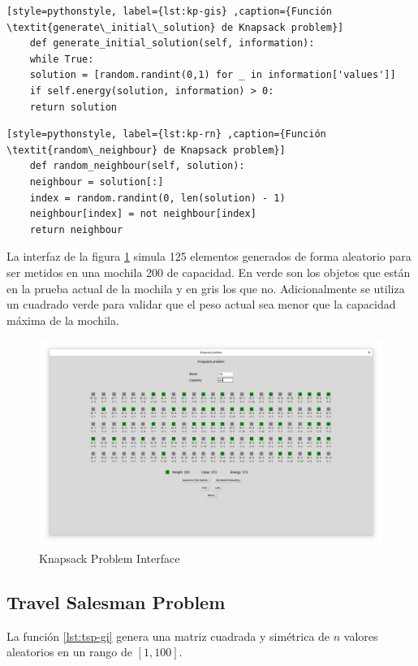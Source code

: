 \begin{lstlisting}[style=pythonstyle, label={lst:kp-gis} ,caption={Función \textit{generate\_initial\_solution} de Knapsack problem}]
	def generate_initial_solution(self, information):
	while True:
	solution = [random.randint(0,1) for _ in information['values']]
	if self.energy(solution, information) > 0:
	return solution
\end{lstlisting}


\begin{lstlisting}[style=pythonstyle, label={lst:kp-rn} ,caption={Función \textit{random\_neighbour} de Knapsack problem}]
	def random_neighbour(self, solution):
	neighbour = solution[:]
	index = random.randint(0, len(solution) - 1)
	neighbour[index] = not neighbour[index]
	return neighbour     
\end{lstlisting}

La interfaz de la figura \ref{fig:kp} simula 125 elementos generados de forma aleatorio para ser metidos en una mochila 200 de capacidad. En verde son los objetos que están en la prueba actual de la mochila y en gris los que no. Adicionalmente se utiliza un cuadrado verde para validar que el peso actual sea menor que la capacidad máxima de la mochila.

\begin{figure}[h!]
	\centering
	\includegraphics[width=\linewidth]{img/kp}
	\caption{Knapsack Problem Interface}
	\label{fig:kp}
\end{figure}

\subsection{Travel Salesman Problem}

La función \ref{lst:tsp-gi} genera una matriz cuadrada y simétrica de $n$ valores aleatorios en un rango de $[1, 100]$.

